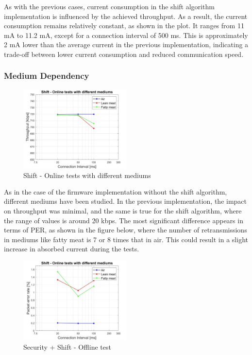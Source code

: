 \documentclass{Configuration_Files/PoliMi3i_thesis}
\begin{document}
As with the previous cases, current consumption in the shift algorithm implementation is influenced by the achieved throughput. As a result, the current consumption remains relatively constant, as shown in the plot. It ranges from 11 mA to 11.2 mA, except for a connection interval of 500 ms. This is approximately 2 mA lower than the average current in the previous implementation, indicating a trade-off between lower current consumption and reduced communication speed.

\subsubsection*{Medium Dependency}

\begin{figure}[H]
    \centering
    \includegraphics[width=0.5\textwidth]{Results Manuel/figure20}
    \caption{Shift - Online tests with different mediums}
    \label{manuel_results_20}
\end{figure}

As in the case of the firmware implementation without the shift algorithm, different mediums have been studied. In the previous implementation, the impact on throughput was minimal, and the same is true for the shift algorithm, where the range of values is around 20 kbps. The most significant difference appears in terms of PER, as shown in the figure below, where the number of retransmissions in mediums like fatty meat is 7 or 8 times that in air. This could result in a slight increase in absorbed current during the tests.

\begin{figure}[H]
    \centering
    \includegraphics[width=0.5\textwidth]{Results Manuel/figure21}
    \caption{Security + Shift - Offline test}
    \label{manuel_results_21}
\end{figure}
\end{document}
